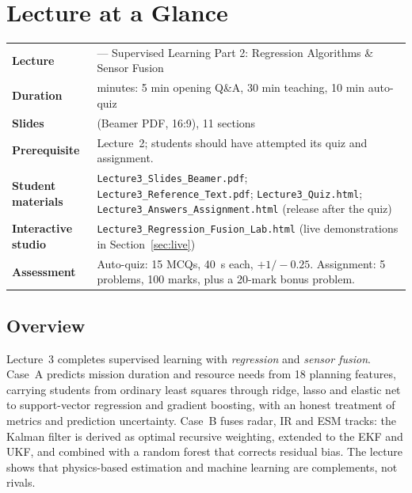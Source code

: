 \documentclass[11pt]{article}
\begin{document}
\section{Lecture at a Glance}

\begin{center}\small\renewcommand{\arraystretch}{1.25}\begin{tabularx}{\textwidth}{@{}>{\bfseries}p{3.3cm}>{\raggedright\arraybackslash}X@{}}\toprule

\textcolor{NavyN}{Lecture}&3 --- Supervised Learning Part 2: Regression Algorithms \& Sensor Fusion\\
\textcolor{NavyN}{Duration}&45 minutes: 5 min opening Q\&A, 30 min teaching, 10 min auto-quiz\\
\textcolor{NavyN}{Slides}&25 (Beamer PDF, 16:9), 11 sections\\
\textcolor{NavyN}{Prerequisite}&Lecture~2; students should have attempted its quiz and assignment.\\
\textcolor{NavyN}{Student materials}&\texttt{Lecture3\_Slides\_Beamer.pdf}; \texttt{Lecture3\_Reference\_Text.pdf}; \texttt{Lecture3\_Quiz.html}; \texttt{Lecture3\_Answers\_Assignment.html} (release after the quiz)\\
\textcolor{NavyN}{Interactive studio}&\texttt{Lecture3\_Regression\_Fusion\_Lab.html} (live demonstrations in Section~\ref{sec:live})\\
\textcolor{NavyN}{Assessment}&Auto-quiz: 15 MCQs, 40~s each, $+1/-0.25$. Assignment: 5 problems, 100 marks, plus a 20-mark bonus problem.\\\bottomrule\end{tabularx}\end{center}

\subsection*{Overview}Lecture~3 completes supervised learning with \emph{regression} and \emph{sensor fusion}. Case~A predicts mission duration and resource needs from 18 planning features, carrying students from ordinary least squares through ridge, lasso and elastic net to support-vector regression and gradient boosting, with an honest treatment of metrics and prediction uncertainty. Case~B fuses radar, IR and ESM tracks: the Kalman filter is derived as optimal recursive weighting, extended to the EKF and UKF, and combined with a random forest that corrects residual bias. The lecture shows that physics-based estimation and machine learning are complements, not rivals.
\end{document}
